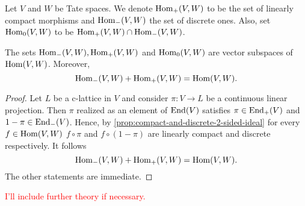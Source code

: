 \begin{definition}\label{def:2-sided-ideals-in-hom}
	Let $V$ and $W$ be Tate spaces. \linebreak We denote $\operatorname{Hom}_{+}(V,W)$ to be the set of linearly compact morphisms and $\operatorname{Hom}_{-}(V,W)$ the set of discrete ones. Also, set $\operatorname{Hom}_{0}(V,W)$ to be $\operatorname{Hom}_{+}(V,W) \cap \operatorname{Hom}_{-}(V,W)$.
\end{definition}
\begin{proposition}\label{prop:discrete-compact-operators-present-the-whole-space}
	The sets $\operatorname{Hom}_{-}(V,W), \operatorname{Hom}_{+}(V,W)$ and \linebreak $\operatorname{Hom}_{0}(V,W)$ are vector subspaces of $\operatorname{Hom}(V,W)$. Moreover,
	\[
		\operatorname{Hom}_{-}(V,W) + \operatorname{Hom}_{+}(V,W) = \operatorname{Hom}(V,W).
	\]
\end{proposition}
\begin{proof}
	Let $L$ be a c-lattice in $V$ and consider $\pi\colon V \to L$ be a continuous linear projection. Then $\pi$ realized as an element of $\operatorname{End}(V)$ satisfies $\pi \in\operatorname{End}_{+}(V)$ and $1 -\pi\in\operatorname{End}_{-}(V)$. Hence, by \cref{prop:compact-and-discrete-2-sided-ideal} for every $f\in \operatorname{Hom}(V,W)$ $f\circ \pi$ and $f\circ (1 - \pi)$ are linearly compact and discrete respectively. It follows
	\[
		\operatorname{Hom}_{-}(V,W) + \operatorname{Hom}_{+}(V,W) = \operatorname{Hom}(V,W).
	\]
	The other statements are immediate.
\end{proof}
\textcolor{red}{I'll include further theory if necessary.}
